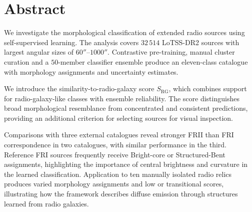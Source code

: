 \section*{\centering Abstract}
{}

\vspace{1cm}
We investigate the morphological classification of extended radio sources using self-supervised learning. The analysis covers \(32\,514\) LoTSS-DR2 sources with largest angular sizes of \(60''\)--\(1000''\). Contrastive pre-training, manual cluster curation and a \(50\)-member classifier ensemble produce an eleven-class catalogue with morphology assignments and uncertainty estimates.

We introduce the similarity-to-radio-galaxy score \(S_\mathrm{RG}\), which combines support for radio-galaxy-like classes with ensemble reliability. The score distinguishes broad morphological resemblance from concentrated and consistent predictions, providing an additional criterion for selecting sources for visual inspection.

Comparisons with three external catalogues reveal stronger FRII than FRI correspondence in two catalogues, with similar performance in the third. Reference FRI sources frequently receive Bright-core or Structured-Bent assignments, highlighting the importance of central brightness and curvature in the learned classification. Application to ten manually isolated radio relics produces varied morphology assignments and low or transitional scores, illustrating how the framework describes diffuse emission through structures learned from radio galaxies.
